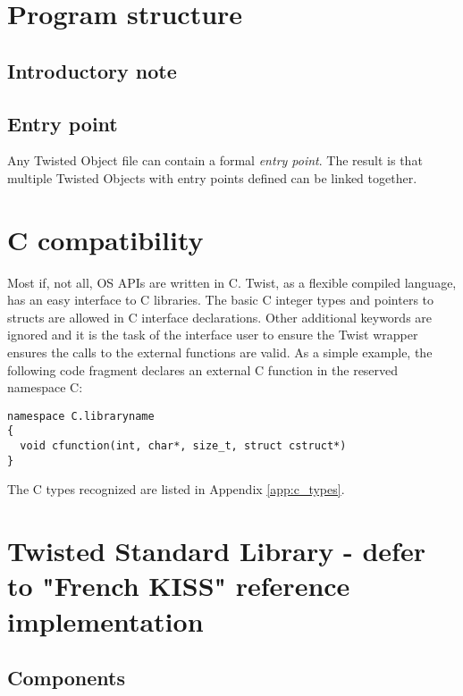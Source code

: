 \documentclass[a4paper,11pt]{report}
\begin{document}
\section{Program structure}
  \subsection{Introductory note}


  \subsection{Entry point}

Any Twisted Object file can contain a formal \emph{entry point}.
The result is that multiple Twisted Objects with entry points defined can be linked together. 

\section{C compatibility} \label{sec:c_compatibility}

Most if, not all, OS APIs are written in C.
Twist, as a flexible compiled language, has an easy interface to C libraries.
The basic C integer types and pointers to structs are allowed in C interface declarations.
Other additional keywords are ignored and it is the task of the interface user to ensure the Twist wrapper ensures the calls to the external functions are valid.
As a simple example, the following code fragment declares an external C function in the reserved namespace C:
\begin{lstlisting}
namespace C.libraryname
{
  void cfunction(int, char*, size_t, struct cstruct*)
}
\end{lstlisting}
The C types recognized are listed in Appendix \ref{app:c_types}.

\section{Twisted Standard Library -  defer to "French KISS" reference implementation}
  \subsection{Components}
\end{document}
